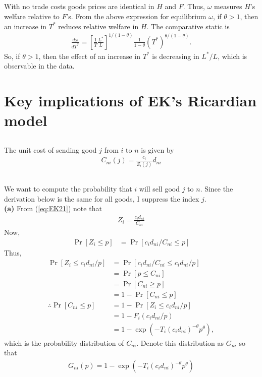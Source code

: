 \documentclass[12pt]{article}
\begin{document}
\subsection{}
With no trade costs goods prices are identical in $H$ and $F$. Thus, $\omega$ measures $H$'s welfare relative to $F$'s. From the above expression for equilibrium $\omega$, if $\theta > 1$, then an increase in $T^*$ reduces relative welfare in $H$. The comparative static is
\begin{align*}
\frac{d\omega}{dT^*} = \left[\frac{1}{T}\frac{L^*}{L}\right]^{1/(1-\theta)} \frac{1}{1-\theta} (T^*)^{\theta/(1-\theta)}.
\end{align*}
So, if $\theta > 1$, then the effect of an increase in $T^*$ is decreasing in $L^*/L$, which is observable in the data.

\section{Key implications of EK's Ricardian model}

\subsection{}
The unit cost of sending good $j$ from $i$ to $n$ is given by
\begin{align}
C_{ni}(j) = \frac{c_i}{Z_i(j)}d_{ni} \label{eq:EK21}
\end{align}

\subsection{}
We want to compute the probability that $i$ will sell good $j$ to $n$. Since the derivation below is the same for all goods, I suppress the index $j$. \\

\textbf{(a)} From (\ref{eq:EK21}) note that 
\begin{align*}
Z_i = \frac{c_id_{ni}}{C_{ni}}
\end{align*}
Now,
\begin{align*}
\Pr[Z_i \leq p] &= \Pr[{c_id_{ni}}/{C_{ni}} \leq p]
\end{align*}
Thus,
\begin{align*}
\Pr[Z_i \leq {c_id_{ni}}/{p} ] &=  \Pr[{c_id_{ni}}/{C_{ni}} \leq {c_id_{ni}}/{p}]\\
&= \Pr[p \leq C_{ni}]\\
&= \Pr[C_{ni} \geq p]\\
&= 1- \Pr[C_{ni} \leq p]\\
\therefore \Pr[C_{ni} \leq p] &= 1-\Pr[Z_i \leq {c_id_{ni}}/{p} ]\\
&= 1- F_i(c_id_{ni}/{p})\\
&= 1- \exp(-T_i(c_id_{ni})^{-\theta}p^\theta),
\end{align*}
which is the probability distribution of $C_{ni}$. Denote this distribution as $G_{ni}$ so that
\begin{align}
G_{ni}(p) = 1- \exp(-T_i(c_id_{ni})^{-\theta}p^\theta) \label{eq:EK22}
\end{align}
\end{document}
